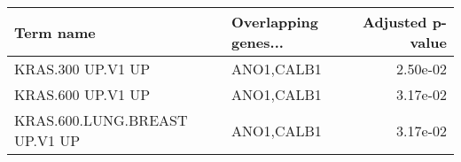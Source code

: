 \begin{tabular}{llr}
\toprule
                    Term name & Overlapping genes... &  Adjusted p-value \\
\midrule
            KRAS.300 UP.V1 UP &           ANO1,CALB1 &          2.50e-02 \\
            KRAS.600 UP.V1 UP &           ANO1,CALB1 &          3.17e-02 \\
KRAS.600.LUNG.BREAST UP.V1 UP &           ANO1,CALB1 &          3.17e-02 \\
\bottomrule
\end{tabular}
